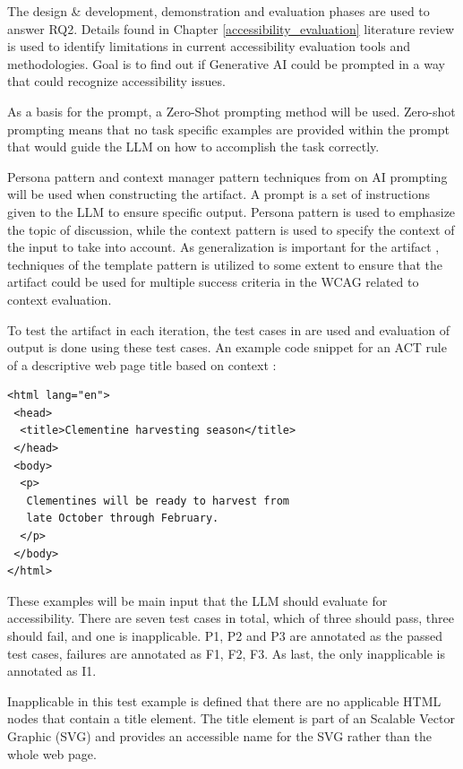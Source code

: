 The design \& development, demonstration and evaluation phases are used to answer RQ2. Details found in Chapter \ref{accessibility_evaluation} literature review is used to identify limitations in current accessibility evaluation tools and methodologies. Goal is to find out if Generative AI could be prompted in a way that could recognize accessibility issues. 

As a basis for the prompt, a Zero-Shot prompting method will be used. Zero-shot prompting means that no task specific examples are provided within the prompt that would guide the LLM on how to accomplish the task correctly.

Persona pattern and context manager pattern techniques from \textcite{white2023prompt} on AI prompting will be used when constructing the artifact. A prompt is a set of instructions given to the LLM to ensure specific output. Persona pattern is used to emphasize the topic of discussion, while the context pattern is used to specify the context of the input to take into account. As generalization is important for the artifact \citep{design_science_eval}, techniques of the template pattern is utilized to some extent to ensure that the artifact could be used for multiple success criteria in the WCAG related to context evaluation.

To test the artifact in each iteration, the test cases in \textcite{act_rule_g88} are used and evaluation of output is done using these test cases. An example code snippet for an ACT rule of a descriptive web page title based on context \citep{act_rule_g88}:

\begin{verbatim}
<html lang="en">
 <head>
  <title>Clementine harvesting season</title>
 </head>
 <body>
  <p>
   Clementines will be ready to harvest from 
   late October through February.
  </p>
 </body>
</html>
\end{verbatim}

These examples will be main input that the LLM should evaluate for accessibility. There are seven test cases in total, which of three should pass, three should fail, and one is inapplicable. P1, P2 and P3 are annotated as the passed test cases, failures are annotated as F1, F2, F3. As last, the only inapplicable is annotated as I1.

Inapplicable in this test example is defined that there are no applicable HTML nodes that contain a title element. The title element is part of an Scalable Vector Graphic (SVG) and provides an accessible name for the SVG rather than the whole web page.


